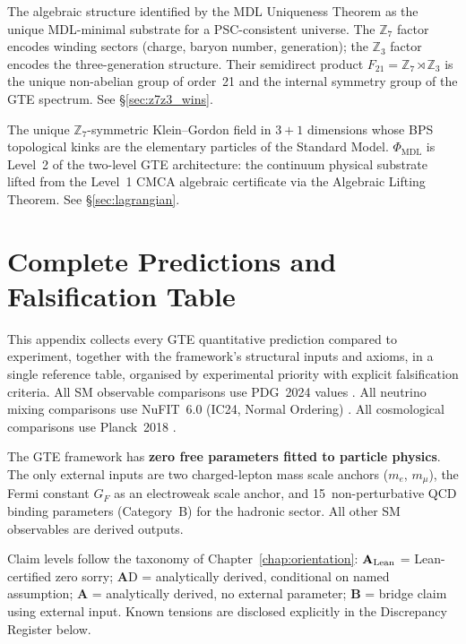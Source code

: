 \documentclass[11pt,openany]{book}
\theoremstyle{remark}
\newcommand{\PHIMDL}{\Phi_{\mathrm{MDL}}}
\newcommand{\CatA}{\textbf{A}}
\newcommand{\CatAL}{\ensuremath{\textbf{A}_{\rm Lean}}}
\newcommand{\CatB}{\textbf{B}}
\begin{document}
\begin{appendices}
\begin{description}[leftmargin=*,font=\bfseries,itemsep=6pt]
\item[$F_{21}=\mathbb{Z}_7\rtimes\mathbb{Z}_3$]
The algebraic structure identified by the MDL Uniqueness Theorem as the unique
MDL-minimal substrate for a PSC-consistent universe.
The $\mathbb{Z}_7$ factor encodes winding sectors (charge, baryon number, generation);
the $\mathbb{Z}_3$ factor encodes the three-generation structure.
Their semidirect product $F_{21}=\mathbb{Z}_7\rtimes\mathbb{Z}_3$ is the unique
non-abelian group of order~21 and the internal symmetry group of the GTE spectrum.
See \S\ref{sec:z7z3_wins}.

\item[$\PHIMDL$ --- Physical MDL field]
The unique $\mathbb{Z}_7$-symmetric Klein--Gordon field in $3{+}1$ dimensions whose
BPS topological kinks are the elementary particles of the Standard Model.
$\PHIMDL$ is Level~2 of the two-level GTE architecture: the continuum physical
substrate lifted from the Level~1 CMCA algebraic certificate via the Algebraic
Lifting Theorem.
See \S\ref{sec:lagrangian}.

\end{description}


\chapter[Complete Predictions Table]{Complete Predictions and Falsification Table}
\label{app:new_physics_predictions}

This appendix collects every GTE quantitative prediction compared to experiment, together
with the framework's structural inputs and axioms, in a single reference table, organised
by experimental priority with explicit falsification criteria.
All SM observable comparisons use PDG~2024 values \cite{ParticleDataGroup2024}.
All neutrino mixing comparisons use NuFIT~6.0 (IC24, Normal Ordering) \cite{NuFIT60}.
All cosmological comparisons use Planck~2018 \cite{Planck2018}.

The GTE framework has \textbf{zero free parameters fitted to particle physics}.
The only external inputs are two charged-lepton mass scale anchors ($m_e$, $m_\mu$),
the Fermi constant $G_F$ as an electroweak scale anchor, and 15~non-perturbative QCD
binding parameters (Category~B) for the hadronic sector.
All other SM observables are derived outputs.

Claim levels follow the taxonomy of Chapter~\ref{chap:orientation}: \CatAL{} = Lean-certified
zero sorry; \CatA{}D = analytically derived, conditional on named assumption;
\CatA{} = analytically derived, no external parameter; \CatB{} = bridge claim
using external input.  Known tensions are disclosed explicitly in the Discrepancy
Register below.


\end{appendices}
\end{document}
